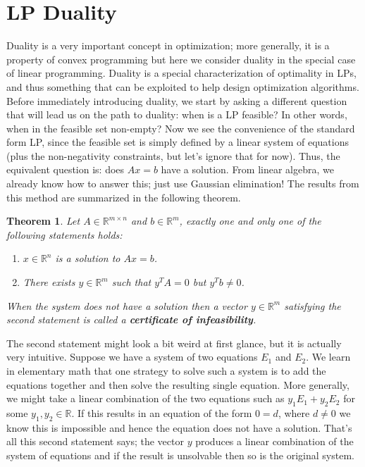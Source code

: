\documentclass[12pt]{article}
\newcommand{\R}{\mathcal{R}}
\def\R{\mathbb{R}}
\newtheorem{thm}{Theorem}
\begin{document}
\section{LP Duality}
Duality is a very important concept in optimization; more generally, it is a property of convex programming but here we consider duality in the special case of linear programming. Duality 
is a special characterization of optimality in LPs, and thus something that can be exploited to help design optimization algorithms. Before immediately introducing duality, we start by asking 
a different question that will lead us on the path to duality: when is a LP feasible? In other words, when in the feasible set non-empty? Now we see the convenience of the standard form LP, since 
the feasible set is simply defined by a linear system of equations (plus the non-negativity constraints, but let's ignore that for now). Thus, the equivalent question is: does $Ax = b$ have a solution. 
From linear algebra, we already know how to answer this; just use Gaussian elimination! The results from this method are summarized in the following theorem. 
\begin{thm}
Let $A \in \R^{m \times n}$ and $b \in \R^m$, exactly one and only one of the following statements holds: 
\begin{enumerate}
\item $x \in \R^n$ is a solution to $Ax = b$.
\item There exists $y \in \R^m$ such that $y^T A = 0$ but $y^T b \neq 0$. 
\end{enumerate}
When the system does not have a solution then a vector $y \in \R^m$ satisfying the second statement is called a \textbf{certificate of infeasibility}. 
\end{thm}
The second statement might look a bit weird at first glance, but it is actually very intuitive. Suppose we have a system of two equations $E_1$ and $E_2$. We learn in elementary math 
that one strategy to solve such a system is to add the equations together and then solve the resulting single equation. More generally, we might take a linear combination of the two equations
such as $y_1 E_1 + y_2 E_2$ for some $y_1, y_2 \in \R$. If this results in an equation of the form $0 = d$, where $d \neq 0$ we know this is impossible and hence the equation does not have a 
solution. That's all this second statement says; the vector $y$ produces a linear combination of the system of equations and if the result is unsolvable then so is the original system. 
\end{document}

